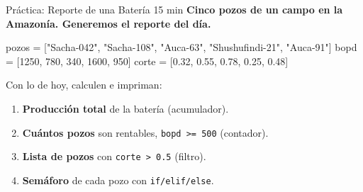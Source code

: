 \documentclass[aspectratio=169, 11pt]{beamer}
\begin{document}
\begin{frame}[fragile,shrink=6]{Práctica: Reporte de una Batería \hfill {\normalsize\color{arcaRed}\faClock\hspace{4pt}15 min}}
  \vspace{-4pt}
  {\small\color{arcaDark}\bfseries
    Cinco pozos de un campo en la Amazonía. Generemos el reporte del día.}

  \vspace{3pt}
  \begin{pyblock}
pozos = ["Sacha-042", "Sacha-108", "Auca-63", "Shushufindi-21", "Auca-91"]
bopd  = [1250, 780, 340, 1600, 950]
corte = [0.32, 0.55, 0.78, 0.25, 0.48]
  \end{pyblock}

  \vspace{3pt}
  {\footnotesize\color{textMuted}Con lo de hoy, calculen e impriman:}

  \vspace{2pt}
  {\footnotesize
  \begin{enumerate}\setlength{\itemsep}{2pt}
    \item[{\color{arcaRed}\bfseries 1.}]
      \textbf{Producción total} de la batería (acumulador).
    \item[{\color{arcaRed}\bfseries 2.}]
      \textbf{Cuántos pozos} son rentables, \texttt{bopd >= 500} (contador).
    \item[{\color{arcaRed}\bfseries 3.}]
      \textbf{Lista de pozos} con \texttt{corte > 0.5} (filtro).
    \item[{\color{arcaRed}\bfseries 4.}]
      \textbf{Semáforo} de cada pozo con \texttt{if/elif/else}.
  \end{enumerate}
  }
\end{frame}
\end{document}
